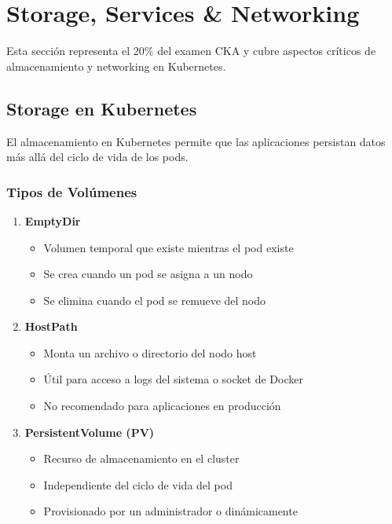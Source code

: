 \documentclass[11pt,a4paper]{article}
\begin{document}
\newpage

\section{Storage, Services \& Networking}

\begin{infobox}
Esta sección representa el 20\% del examen CKA y cubre aspectos críticos de almacenamiento y networking en Kubernetes.
\end{infobox}

\subsection{Storage en Kubernetes}

El almacenamiento en Kubernetes permite que las aplicaciones persistan datos más allá del ciclo de vida de los pods.

\subsubsection{Tipos de Volúmenes}

\begin{enumerate}
    \item \textbf{\textcolor{k8sblue}{EmptyDir}}
    \begin{itemize}
        \item Volumen temporal que existe mientras el pod existe
        \item Se crea cuando un pod se asigna a un nodo
        \item Se elimina cuando el pod se remueve del nodo
    \end{itemize}
    
    \item \textbf{\textcolor{k8ssuccess}{HostPath}}
    \begin{itemize}
        \item Monta un archivo o directorio del nodo host
        \item Útil para acceso a logs del sistema o socket de Docker
        \item No recomendado para aplicaciones en producción
    \end{itemize}
    
    \item \textbf{\textcolor{k8swarning}{PersistentVolume (PV)}}
    \begin{itemize}
        \item Recurso de almacenamiento en el cluster
        \item Independiente del ciclo de vida del pod
        \item Provisionado por un administrador o dinámicamente
    \end{itemize}
\end{enumerate}
\end{document}
